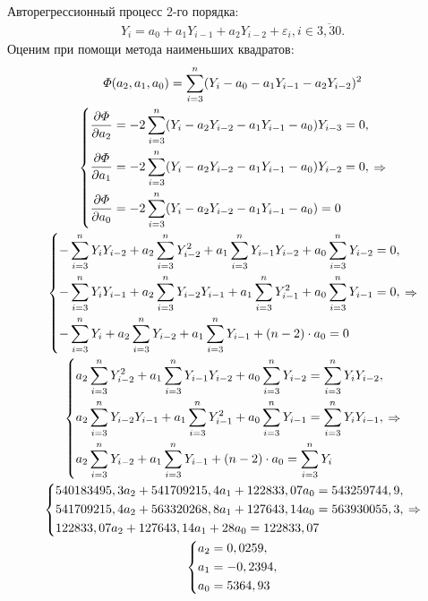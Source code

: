 \documentclass[utf8, a4paper, 14pt, russian, oneside]{book}
\begin{document}

Авторегрессионный процесс 2-го порядка:
\begin{gather*}
    Y_i = a_0 + a_1 Y_{i-1} + a_2 Y_{i-2} + \varepsilon_i, i \in \overline{3, 30}.
\end{gather*}
Оценим при помощи метода наименьших квадратов:
\begin{gather*}
    \varPhi(a_2, a_1, a_0) = \sum\limits_{i=3}^n (Y_i - a_0 - a_1Y_{i-1} - a_2Y_{i-2})^2 \\ 
    \begin{dcases}
         \frac{\partial \varPhi}{\partial a_2}  = -2 \sum\limits_{i=3}^n (Y_i - a_2Y_{i-2} - a_1Y_{i-1} - a_0)Y_{i-3} = 0, \\
         \frac{\partial \varPhi}{\partial a_1}  = -2 \sum\limits_{i=3}^n (Y_i - a_2Y_{i-2} - a_1Y_{i-1} - a_0)Y_{i-2} = 0, \\
         \frac{\partial \varPhi}{\partial a_0}  = -2 \sum\limits_{i=3}^n (Y_i - a_2Y_{i-2} - a_1Y_{i-1} - a_0) = 0
    \end{dcases}
    \Rightarrow \\
    \begin{dcases}
        -\sum\limits_{i=3}^nY_iY_{i-2} + a_2 \sum\limits_{i=3}^nY^2_{i-2} + a_1\sum\limits_{i=3}^nY_{i-1}Y_{i-2} + a_0\sum\limits_{i=3}^nY_{i-2} = 0, \\
        -\sum\limits_{i=3}^nY_iY_{i-1} + a_2 \sum\limits_{i=3}^nY_{i-2}Y_{i-1} + a_1 \sum\limits_{i=3}^nY^2_{i-1} + a_0\sum\limits_{i=3}^nY_{i-1} = 0, \\
        -\sum\limits_{i=3}^nY_i + a_2 \sum\limits_{i=3}^nY_{i-2} + a_1 \sum\limits_{i=3}^nY_{i-1} + (n-2) \cdot  a_0 = 0
    \end{dcases}
    \Rightarrow \\
    \begin{dcases}
        a_2\sum\limits_{i=3}^n Y_{i-2}^2 + a_1 \sum\limits_{i=3}^n Y_{i-1}Y_{i-2} + a_0\sum\limits_{i=3}^n Y_{i-2} = \sum\limits_{i=3}^n Y_iY_{i-2}, \\
        a_2\sum\limits_{i=3}^nY_{i-2}Y_{i-1} + a_1 \sum\limits_{i=3}^nY^2_{i-1} + a_0\sum\limits_{i=3}^nY_{i-1} = \sum\limits_{i=3}^nY_iY_{i-1}, \\
        a_2\sum\limits_{i=3}^nY_{i-2} + a_1\sum\limits_{i=3}^nY_{i-1} + (n-2)\cdot a_0 = \sum\limits_{i=3}^nY_i
    \end{dcases}
    \Rightarrow \\
    \begin{dcases}
        540183495,3 a_2 + 541709215,4 a_1 + 122833,07 a_0 = 543259744,9, \\
        541709215,4 a_2 + 563320268,8 a_1 + 127643,14 a_0 = 563930055,3, \\
        122833,07 a_2 + 127643,14 a_1 + 28 a_0 = 122833,07
    \end{dcases}
    \Rightarrow \\
    \begin{dcases}
        a_2 = 0,0259, \\
        a_1 = -0,2394, \\
        a_0 = 5364,93
    \end{dcases}
\end{gather*}
\end{document}
